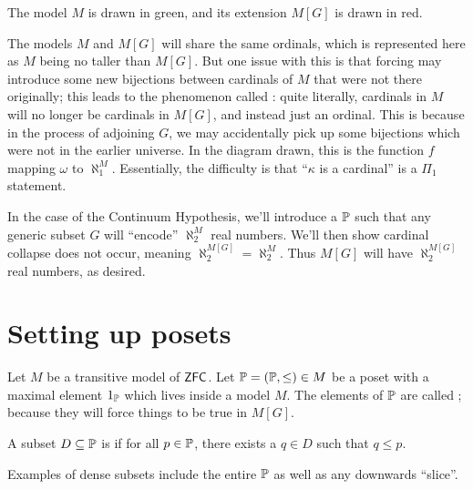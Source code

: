 The model $M$ is drawn in green, and its extension $M[G]$ is drawn in red.

The models $M$ and $M[G]$ will share the same ordinals, which is represented here
as $M$ being no taller than $M[G]$.
But one issue with this is that forcing may introduce some new bijections between cardinals of $M$
that were not there originally; this leads to the phenomenon called :
quite literally, cardinals in $M$ will no longer be cardinals in $M[G]$, and instead just an ordinal.
This is because in the process of adjoining $G$, we may accidentally pick up some bijections which were not in the earlier universe.
In the diagram drawn, this is the function $f$ mapping $\omega$ to $\aleph_1^M$.
Essentially, the difficulty is that ``$\kappa$ is a cardinal'' is a $\Pi_1$ statement.

In the case of the Continuum Hypothesis, we'll introduce a $\mathbb P$ such that
any generic subset $G$ will ``encode'' $\aleph_2^M$ real numbers.
We'll then show cardinal collapse does not occur, meaning $\aleph_2^{M[G]} = \aleph_2^M$.
Thus $M[G]$ will have $\aleph_2^{M[G]}$ real numbers, as desired.

\section{Setting up posets}
Let $M$ be a transitive model of $\mathsf{ZFC}$.
Let $\mathbb P = (\mathbb P, \le) \in M$ be a poset with a maximal element $1_\mathbb P$
which lives inside a model $M$.
The elements of $\mathbb P$ are called ;
because they will force things to be true in $M[G]$.

\begin{definition}
	A subset $D \subseteq \mathbb P$ is  if for all $p \in \mathbb P$,
	there exists a $q  \in D$ such that $q \le p$.
\end{definition}
Examples of dense subsets include the entire $\mathbb P$ as well
as any downwards ``slice''.

